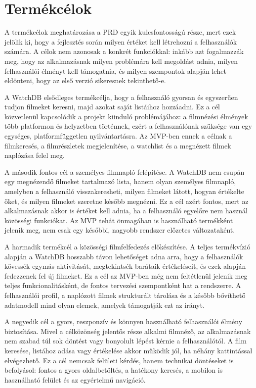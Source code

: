 \section{Termékcélok}

A termékcélok meghatározása a PRD egyik kulcsfontosságú része, mert ezek jelölik ki, hogy a fejlesztés során milyen értéket kell létrehozni a felhasználók számára. A célok nem azonosak a konkrét funkciókkal: inkább azt fogalmazzák meg, hogy az alkalmazásnak milyen problémára kell megoldást adnia, milyen felhasználói élményt kell támogatnia, és milyen szempontok alapján lehet eldönteni, hogy az első verzió sikeresnek tekinthető-e.

A WatchDB elsődleges termékcélja, hogy a felhasználó gyorsan és egyszerűen tudjon filmeket keresni, majd azokat saját listáihoz hozzáadni. Ez a cél közvetlenül kapcsolódik a projekt kiinduló problémájához: a filmnézési élmények több platformon és helyzetben történnek, ezért a felhasználónak szüksége van egy egységes, platformfüggetlen nyilvántartásra. Az MVP-ben ennek a célnak a filmkeresés, a filmrészletek megjelenítése, a watchlist és a megnézett filmek naplózása felel meg.

A második fontos cél a személyes filmnapló felépítése. A WatchDB nem csupán egy megnézendő filmeket tartalmazó lista, hanem olyan személyes filmnapló, amelyben a felhasználó visszakeresheti, milyen filmeket látott, hogyan értékelte őket, és milyen filmeket szeretne később megnézni. Ez a cél azért fontos, mert az alkalmazásnak akkor is értéket kell adnia, ha a felhasználó egyelőre nem használ közösségi funkciókat. Az MVP tehát önmagában is használható termékként jelenik meg, nem csak egy későbbi, nagyobb rendszer előzetes változataként.

A harmadik termékcél a közösségi filmfelfedezés előkészítése. A teljes termékvízió alapján a WatchDB hosszabb távon lehetőséget adna arra, hogy a felhasználók kövessék egymás aktivitását, megtekintsék barátaik értékeléseit, és ezek alapján fedezzenek fel új filmeket. Ez a cél az MVP-ben még nem feltétlenül jelenik meg teljes funkcionalitásként, de fontos tervezési szempontként hat a rendszerre. A felhasználói profil, a naplózott filmek strukturált tárolása és a később bővíthető adatmodell mind olyan elemek, amelyek támogatják ezt az irányt.

A negyedik cél a gyors, reszponzív és könnyen használható felhasználói élmény biztosítása. Mivel a célközönség jelentős része alkalmi filmnéző, az alkalmazásnak nem szabad túl sok döntést vagy bonyolult lépést kérnie a felhasználótól. A film keresése, listához adása vagy értékelése akkor működik jól, ha néhány kattintással elvégezhető. Ez a cél nemcsak felületi kérdés, hanem technikai döntéseket is befolyásol: fontos a gyors oldalbetöltés, a hatékony keresés, a mobilon is használható felület és az egyértelmű navigáció.

